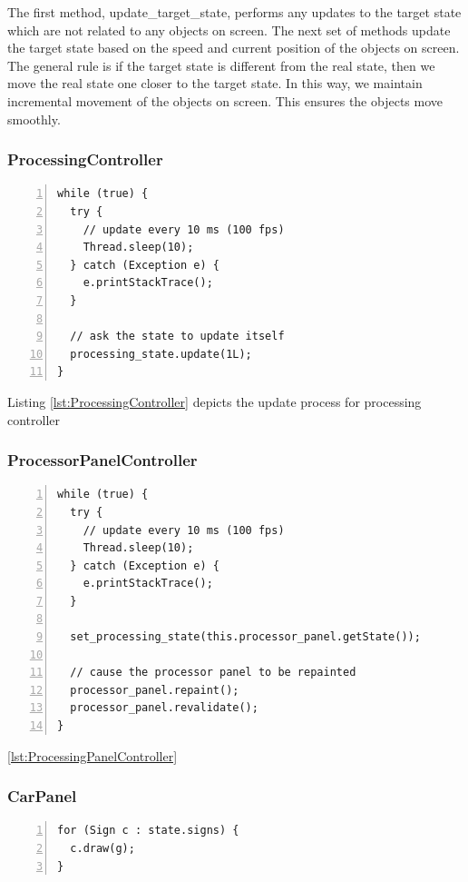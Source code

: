 \documentclass{article} %
\begin{document}
The first method, update\_target\_state, performs any updates to the target state which are not related to any objects on screen.
The next set of methods update the target state based on the speed and current position of the objects on screen.
The general rule is if the target state is different from the real state, then we move the real state one closer to the target state.
In this way, we maintain incremental movement of the objects on screen.
This ensures the objects move smoothly.

\subsubsection{ProcessingController}
\begin{lstlisting}[caption={Processing Controller Update Procedure},label={lst:ProcessingController},numbers=left]
while (true) {
  try {
    // update every 10 ms (100 fps)
    Thread.sleep(10);
  } catch (Exception e) {
    e.printStackTrace();
  }

  // ask the state to update itself
  processing_state.update(1L);
}
\end{lstlisting}

Listing \ref{lst:ProcessingController} depicts the update process for processing controller

\subsubsection{ProcessorPanelController}
\begin{lstlisting}[caption={Processing Panel Update Procedure},label={lst:ProcessingPanelController},numbers=left]
while (true) {
  try {
    // update every 10 ms (100 fps)
    Thread.sleep(10);
  } catch (Exception e) {
    e.printStackTrace();
  }

  set_processing_state(this.processor_panel.getState());
  
  // cause the processor panel to be repainted
  processor_panel.repaint();
  processor_panel.revalidate();
}
\end{lstlisting}

\ref{lst:ProcessingPanelController}

\subsubsection{CarPanel}
\begin{lstlisting}[caption={Ask Signs to Draw Themselves},label={lst:CarPanel},numbers=left]
for (Sign c : state.signs) {
  c.draw(g);
}
\end{lstlisting}
\end{document}

